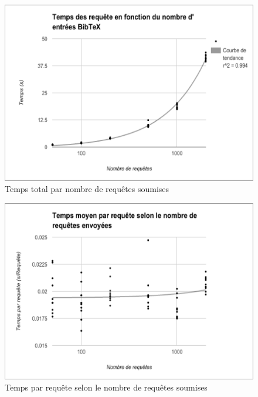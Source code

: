 \documentclass[12pt,titlepage]{article}
\begin{document}
\begin{figure}[h!]
\caption{Temps total par nombre de requêtes soumises}
\includegraphics[width=\textwidth,height=\textheight,keepaspectratio]{tempsparrequete.pdf}
\end{figure}

\begin{figure}[h!]
\caption{Temps par requête selon le nombre de requêtes soumises}
\includegraphics[width=\textwidth,height=\textheight,keepaspectratio]{tempsparequeteparrequete.pdf}
\end{figure}
\end{document}
